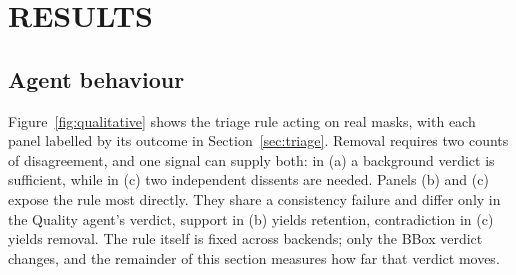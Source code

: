 \documentclass[a4paper,twoside]{article}
\begin{document}
\section{\uppercase{Results}}
\label{sec:results}

\subsection{Agent behaviour}

Figure~\ref{fig:qualitative} shows the triage rule acting on real masks, with each panel labelled by its outcome in Section~\ref{sec:triage}.
Removal requires two counts of disagreement, and one signal can supply both: in (a) a background verdict is sufficient, while in (c) two independent dissents are needed.
Panels (b) and (c) expose the rule most directly. They share a consistency failure and differ only in the Quality agent’s verdict, support in (b) yields retention, contradiction in (c) yields removal.
The rule itself is fixed across backends; only the BBox verdict changes, and the remainder of this section measures how far that verdict moves.
\end{document}
